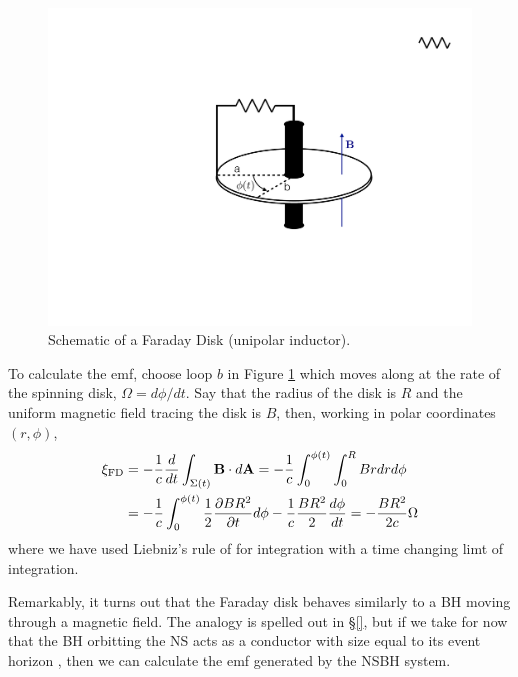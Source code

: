 \begin{figure}
\begin{center}
\includegraphics[scale=0.33]{figures/ch0/UI_schematic} 
\end{center}
\caption{Schematic of a Faraday Disk (unipolar inductor).}
\label{Fig:FDschem}
\end{figure}


To calculate the emf, choose loop $b$ in Figure \ref{Fig:FDschem} which moves
along at the rate of the spinning disk, $\Omega = d\phi/dt$. Say that the
radius of the disk is $R$ and the uniform magnetic field tracing the disk is $B$, then, working in polar coordinates $(r, \phi)$,
\begin{align}
\xi_{\rm FD} &= - \frac{1}{c} \frac{d}{dt} \int_{\Sigma(t)}{{\bf B} \cdot d{\bf A}} =  - \frac{1}{c} \int^{\phi(t)}_{0} \int^{R}_{0}{B r dr d\phi}  \\
&= - \frac{1}{c} \int^{\phi(t)}_{0}{\frac{1}{2}\frac{\partial B R^2}{\partial t} d\phi} -  \frac{1}{c} \frac{B R^2}{2} \frac{d\phi}{dt}  = -\frac{B R^2}{2c} \Omega
\end{align}
where we have used Liebniz's rule of for integration with a time changing limt of integration. 

Remarkably, it turns out that the Faraday disk behaves similarly to a BH
moving through a magnetic field. The analogy is spelled out in \S \ref{}, but
if we take for now that the BH orbitting the NS acts as a conductor with size
equal to its event horizon \citep{MPBook}, then we can calculate the emf
generated by the NSBH system. 


